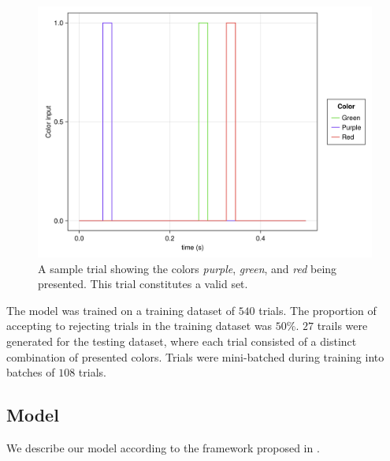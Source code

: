 \documentclass[conference]{IEEEtran}
\begin{document}
\begin{figure}[htbp]
\centerline{\includegraphics[scale=0.10]{example_trial.png}}
\caption{A sample trial showing the colors \textit{purple}, \textit{green}, and \textit{red} being presented. This trial constitutes a valid set.}
\label{trial}
\end{figure}

The model was trained on a training dataset of $540$ trials. The proportion of accepting to rejecting trials in the training dataset was $50\%$. $27$ trails were generated for the testing dataset, where each trial consisted of a distinct combination of presented colors. Trials were mini-batched during training into batches of $108$ trials.

\subsection{Model}
\label{ctrnnmodel}

We describe our model according to the framework proposed in \cite{richards2019deep}.
\end{document}
